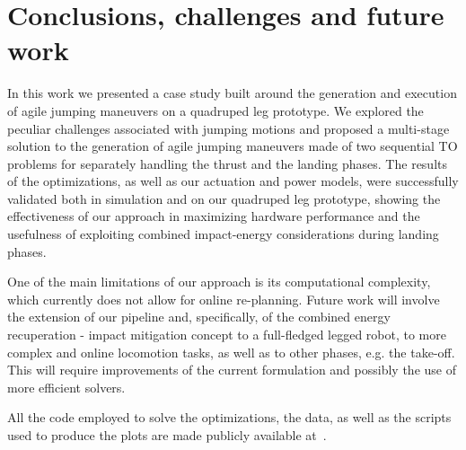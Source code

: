 \section{Conclusions, challenges and future work}\label{sec:conclusions}
In this work we presented a case study built around the generation and execution of agile jumping maneuvers on a quadruped leg prototype.  
We 
explored the peculiar challenges associated with jumping motions and 
proposed a multi-stage solution 
to the generation of agile jumping maneuvers 
made of two sequential TO problems for separately handling the thrust 
and the landing phases.
The results of the optimizations, as well as our actuation and power models, were successfully validated both in simulation and on our quadruped leg prototype, showing the effectiveness of our approach in maximizing hardware performance and the usefulness of exploiting combined impact-energy considerations during landing phases.

One of the main limitations of our approach is its computational complexity, which currently does not allow for online re-planning. Future work will involve the extension of our pipeline and, specifically, of the combined energy recuperation - impact mitigation concept to a full-fledged legged robot, to more complex and online locomotion tasks, as well as to other phases, e.g. the take-off.
This will require improvements of the current formulation and possibly the use of more efficient solvers.  

All the code employed to solve the optimizations, the  data, as well as the scripts used to produce the plots are made publicly available at~\cite{url::awesome_leg_repo}.